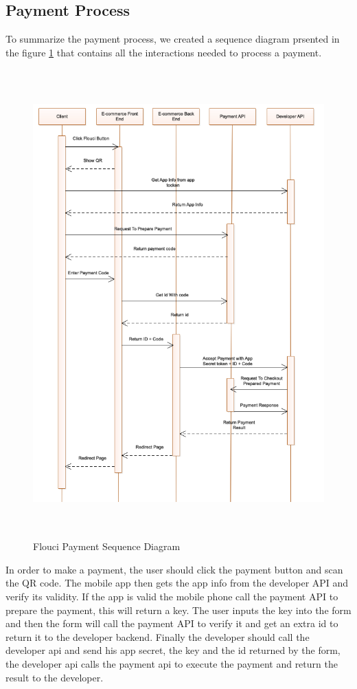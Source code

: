 \begin{spacing}{1.2}
\section{Payment Process}
To summarize the payment process, we created a sequence diagram prsented in the figure \ref{fig:FPSD} that contains all the interactions needed to process a payment.
\begin{figure}[H]\centering
\includegraphics[width=\textwidth,height=18cm]{Payment_Sequence_Diagram.png}
\caption{Flouci Payment Sequence Diagram}
\label{fig:FPSD}
\end{figure}
In order to make a payment, the user should click the payment button and scan the QR code. The mobile app then gets the app info from the developer API and verify its validity. If the app is valid the mobile phone call the payment API to prepare the payment, this will return a key. The user inputs the key into the form and then the form will call the payment API to verify it and get an extra id to return it to the developer backend. Finally the developer should call the developer api and send his app secret, the key and the id returned by the form, the developer api calls the payment api to execute the payment and return the result to the developer.

\end{spacing}
